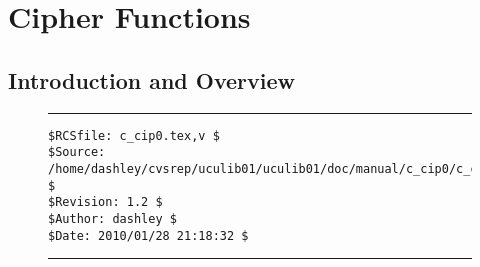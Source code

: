 
\chapter{Cipher Functions}

\label{ccip0}

\section{Introduction and Overview}
\label{ccip0:siov0}


\noindent\begin{figure}[!b]
\noindent\rule[-0.25in]{\textwidth}{1pt}
\begin{tiny}
\begin{verbatim}
$RCSfile: c_cip0.tex,v $
$Source: /home/dashley/cvsrep/uculib01/uculib01/doc/manual/c_cip0/c_cip0.tex,v $
$Revision: 1.2 $
$Author: dashley $
$Date: 2010/01/28 21:18:32 $
\end{verbatim}
\end{tiny}
\noindent\rule[0.25in]{\textwidth}{1pt}
\end{figure}

%
%

